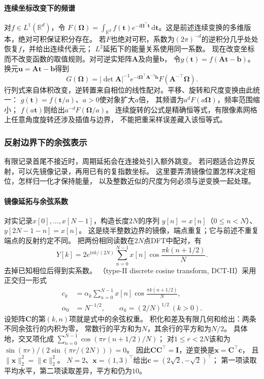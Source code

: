 \paragraph{连续坐标改变下的频谱}
对$f\in L^1(\mathbb R^d)$，令
$F(\bm\Omega)=\int_{\mathbb R^d}f(\bm t)e^{-\mathrm i\bm\Omega^\top\bm t}\,
\mathrm d\bm t$。这是前述连续变换的多维版本，绝对可积保证积分存在。
若$F$也绝对可积，系数为$(2\pi)^{-d}$的逆积分几乎处处恢复$f$，并给出连续代表元；
$L^2$延拓下的能量关系使用同一系数。
现在改变坐标而不改变函数的取值规则。对可逆实矩阵$\bm A$及向量$\bm b$，
令$g(\bm t)=f(\bm A\bm t-\bm b)$。
换元$\bm u=\bm A\bm t-\bm b$得到
\begin{equation}
 G(\bm\Omega)=|\det\bm A|^{-1}
 e^{-\mathrm i\bm\Omega^\top\bm A^{-1}\bm b}
 F(\bm A^{-\top}\bm\Omega).
 \label{eq:signal-fourier-coordinate-change}
\end{equation}
行列式来自体积改变，逆转置来自相位的线性配对。平移、旋转和尺度变换由此统一：
$g(\bm t)=f(\bm t/a)$、$a>0$使对象扩大$a$倍，
其频谱为$a^dF(a\bm\Omega)$，频率范围缩小；
$f(a\bm t)$则给出$a^{-d}F(\bm\Omega/a)$。
连续旋转的公式是精确恒等式，有限像素网格上任意角度旋转还涉及插值与边界，
不能把重采样误差藏入该恒等式。

\subsubsection{反射边界下的余弦表示}
\label{sec:signal-cosine-representation}

有限记录首尾不接近时，周期延拓会在连接处引入额外跳变。
若问题适合边界反射，可以先镜像记录，再用已有的复指数坐标。
这里要弄清镜像位置怎样决定相位，怎样归一化才保持能量，
以及整数近似的尺度为何必须与逆变换一起处理。

\paragraph{镜像延拓与余弦系数}
对实记录$x[0],\ldots,x[N-1]$，构造长度$2N$的序列
$y[n]=x[n]$（$0\leq n<N$）、
$y[2N-1-n]=x[n]$。
这是绕半整数边界的镜像，端点重复；它与前述不重复端点的反射约定不同。
把两份相同读数在$2N$点DFT中配对，有
\[
 Y[k]=2e^{\mathrm i\pi k/(2N)}
 \sum_{n=0}^{N-1}x[n]\cos\frac{\pi k(n+1/2)}N .
\]
去掉已知相位后得到实系数。
（type-II discrete cosine transform, DCT-II）采用正交归一形式
\begin{equation}
 \begin{aligned}
 c_k&=\alpha_k\sum_{n=0}^{N-1}x[n]
 \cos\frac{\pi k(n+1/2)}N,\\
 \alpha_0&=N^{-1/2},\qquad \alpha_k=(2/N)^{1/2}\ (k>0).
 \end{aligned}
 \label{eq:signal-dct-two}
\end{equation}
设矩阵$\bm C$的第$(k,n)$项就是式中的余弦权重。
积化和差及有限几何和给出：两条不同余弦行的内积为零，
常数行的平方和为$N$，其余行的平方和为$N/2$。
具体地，交叉项化成
$\sum_{n=0}^{N-1}\cos(\pi r(n+1/2)/N)$；
对$1\leq r<2N$该和为$\sin(\pi r)/(2\sin(\pi r/(2N)))=0$。
因此$\bm C\bm C^\top=\bm I$，逆变换是$\bm x=\bm C^\top\bm c$，
且$\|\bm x\|_2^2=\|\bm c\|_2^2$。
$N=2$、$\bm x=(1,3)^\top$给出$\bm c=(2\sqrt2,-\sqrt2)^\top$；
第一项读取平均水平，第二项读取差异，平方和仍为$10$。

